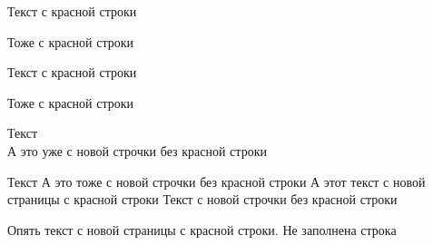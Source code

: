 \documentclass[a4paper, 12pt]{article}
\begin{document}
    Текст с красной строки
    \par %
    Тоже с красной строки
    \vspace{10pt}

    Текст с красной строки
    
    Тоже с красной строки
    \vspace{20pt}

    Текст
    \\ А это уже с новой строчки без красной строки %

    Текст \newline А это тоже с новой строчки без красной строки %
    \newpage %
    А этот текст с новой страницы с красной строки %
    \linebreak Текст с новой строчки без красной строки %

    \pagebreak
    Опять текст с новой страницы с красной строки.
    \pagebreak
    Не заполнена строка %
\end{document}
